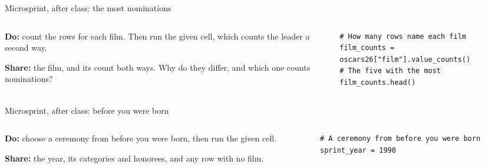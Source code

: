 \documentclass[9pt,aspectratio=169]{beamer}
\begin{document}
\begin{frame}[fragile]{Microsprint, after class: the most nominations}
    \begin{columns}[T]
        \begin{column}{0.37\textwidth}
            \textbf{Do:} count the rows for each film. Then run the given cell, which counts the leader a second way.

            \medskip
            \textbf{Share:} the film, and its count both ways. Why do they differ, and which one counts nominations?
        \end{column}
        \begin{column}{0.6\textwidth}
\begin{lstlisting}
# How many rows name each film
film_counts = oscars26["film"].value_counts()
# The five with the most
film_counts.head()
\end{lstlisting}
        \end{column}
    \end{columns}
\end{frame}

\begin{frame}[fragile]{Microsprint, after class: before you were born}
    \begin{columns}[T]
        \begin{column}{0.37\textwidth}
            \textbf{Do:} choose a ceremony from before you were born, then run the given cell.

            \medskip
            \textbf{Share:} the year, its categories and honorees, and any row with no film.
        \end{column}
        \begin{column}{0.6\textwidth}
\begin{lstlisting}
# A ceremony from before you were born
sprint_year = 1990
\end{lstlisting}
        \end{column}
    \end{columns}
\end{frame}
\end{document}
